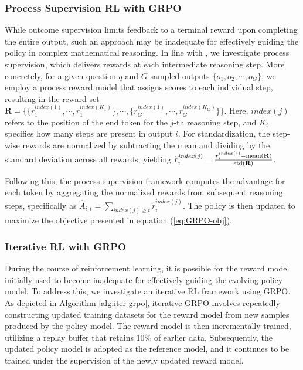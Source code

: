 \begin{itemize}[topsep=0pt]
\subsubsection{Process Supervision RL with GRPO}

While outcome supervision limits feedback to a terminal reward upon completing the entire output, such an approach may be inadequate for effectively guiding the policy in complex mathematical reasoning. In line with \cite{wang2023math}, we investigate process supervision, which delivers rewards at each intermediate reasoning step. More concretely, for a given question $q$ and $G$ sampled outputs $\{o_1, o_2, \cdots, o_G\}$, we employ a process reward model that assigns scores to each individual step, resulting in the reward set $\mathbf{R} = \{ \{r_1^{index(1)},\cdots,r_1^{index(K_1)}\}, \cdots,  \{r_G^{index(1)},\cdots,r_G^{index(K_G)}\} \}$. Here, $index(j)$ refers to the position of the end token for the $j$-th reasoning step, and $K_i$ specifies how many steps are present in output $i$. For standardization, the step-wise rewards are normalized by subtracting the mean and dividing by the standard deviation across all rewards, yielding $\widetilde{r}_i^{index(j)} = \frac{r_i^{index(j)} - {\rm mean(\mathbf{R})}}{{\rm std(\mathbf{R})}}$.

Following this, the process supervision framework computes the advantage for each token by aggregating the normalized rewards from subsequent reasoning steps, specifically as $\hat{A}_{i, t} = \sum_{index(j) \ge t} \widetilde{r}_i^{index(j)}$. The policy is then updated to maximize the objective presented in equation (\ref{eq:GRPO-obj}).

\subsubsection{Iterative RL with GRPO} During the course of reinforcement learning, it is possible for the reward model initially used to become inadequate for effectively guiding the evolving policy model. To address this, we investigate an iterative RL framework using GRPO. As depicted in Algorithm \ref{alg:iter-grpo}, iterative GRPO involves repeatedly constructing updated training datasets for the reward model from new samples produced by the policy model. The reward model is then incrementally trained, utilizing a replay buffer that retains 10\% of earlier data. Subsequently, the updated policy model is adopted as the reference model, and it continues to be trained under the supervision of the newly updated reward model.


\end{itemize}
